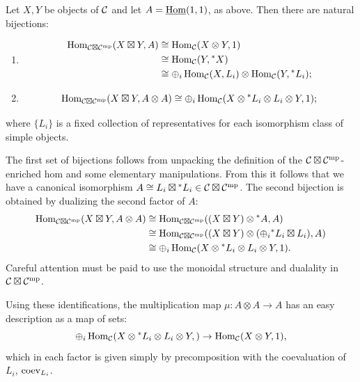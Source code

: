 \documentclass{amsart}
\begin{document}
\begin{lemma}
	Let $X,Y$ be objects of $\mathcal C$ and let $A = \operatorname{\underline{Hom}}(1,1)$, as above. Then there are natural bijections:
	\begin{enumerate}
		\item 
		\begin{align*}
			\operatorname{Hom}_{\mathcal C \boxtimes \mathcal C^{\mathrm{mp}}}(X \boxtimes Y, A) &\cong \operatorname{Hom}_{\mathcal C}(X \otimes Y, 1) \\
				& \cong \operatorname{Hom}_{\mathcal C}(Y, {}^*X) \\
				& \cong \oplus_i \operatorname{Hom}_{\mathcal C}(X, L_i) \otimes \operatorname{Hom}_{\mathcal C}(Y, {}^*L_i);
		\end{align*}
		\item 
		\begin{equation*}
			\operatorname{Hom}_{\mathcal C \boxtimes \mathcal C^{\mathrm{mp}}}(X \boxtimes Y, A \otimes A) \cong \oplus_i \operatorname{Hom}_{\mathcal C}( X \otimes {}^*L_i \otimes L_i \otimes Y, 1);
		\end{equation*}
	\end{enumerate}
	where $\{L_i\}$ is a fixed collection of representatives for each isomorphism class of simple objects.
\end{lemma}

\noindent The first set of bijections follows from unpacking the definition of the $\mathcal C \boxtimes \mathcal C^{\mathrm{mp}}$-enriched hom and some elementary manipulations. From this it follows that we have a canonical isomorphism $A \cong L_i \boxtimes {}^*L_i \in \mathcal C \boxtimes \mathcal C^{\mathrm{mp}}$. The second bijection is obtained by dualizing the second factor of $A$:  
\begin{align*}
	\operatorname{Hom}_{\mathcal C \boxtimes \mathcal C^{\mathrm{mp}}}(X \boxtimes Y, A \otimes A) &\cong \operatorname{Hom}_{\mathcal C \boxtimes \mathcal C^{\mathrm{mp}}}((X \boxtimes Y) \otimes {}^*A, A) \\
	&\cong \operatorname{Hom}_{\mathcal C \boxtimes \mathcal C^{\mathrm{mp}}}((X \boxtimes Y) \otimes (\oplus_i {}^*L_i \boxtimes L_i), A) \\
	&\cong \oplus_i \operatorname{Hom}_{\mathcal C}( X \otimes {}^*L_i \otimes L_i \otimes Y, 1).
\end{align*}
Careful attention must be paid to use the monoidal structure and dualality in $\mathcal C \boxtimes \mathcal C^{\mathrm{mp}}$. 

Using these identifications, the multiplication map $\mu: A \otimes A \to A$ has an easy description as a map of sets:
\begin{equation*}
	\oplus_i \operatorname{Hom}_{\mathcal C}(X \otimes {}^*L_i \otimes L_i \otimes Y,) \to \operatorname{Hom}_{\mathcal C}(X \otimes Y, 1),
\end{equation*} 
which in each factor is given simply by precomposition with the coevaluation of $L_i$,  $\mathrm{coev}_{L_i}$. 
\end{document}
